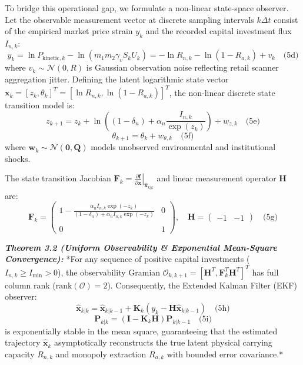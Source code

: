 \documentclass[preprint,12pt,authoryear]{elsarticle}
\theoremstyle{definition}
\begin{document}
To bridge this operational gap, we formulate a non-linear state-space observer. Let the observable measurement vector at discrete sampling intervals $k \Delta t$ consist of the empirical market price strain $y_k$ and the recorded capital investment flux $I_{n,k}$: $$y_k = \ln P_{\text{kinetic},k} - \ln(m_1 m_2 \gamma_v S_k U_k) = -\ln R_{n,k} - \ln(1 - R_{a,k}) + v_k \quad \text{(5d)}$$ where $v_k \sim \mathcal{N}(0, R)$ is Gaussian observation noise reflecting retail scanner aggregation jitter. Defining the latent logarithmic state vector $\mathbf{x}_k = [z_k, \theta_k]^T = [\ln R_{n,k}, \ln(1 - R_{a,k})]^{T}$, the non-linear discrete state transition model is: $$z_{k+1} = z_k + \ln\left( (1 - \delta_n) + \alpha_n \frac{I_{n,k}}{\exp(z_k)} \right) + w_{z,k} \quad \text{(5e)}$$ $$\theta_{k+1} = \theta_k + w_{\theta,k} \quad \text{(5f)}$$ where $\mathbf{w}_k \sim \mathcal{N}(\mathbf{0}, \mathbf{Q})$ models unobserved environmental and institutional shocks.

The state transition Jacobian $\mathbf{F}_k = \left. \frac{\partial \mathbf{f}}{\partial \mathbf{x}} \right|_{\hat{\mathbf{x}}_{k|k}}$ and linear measurement operator $\mathbf{H}$ are: $$\mathbf{F}_k = \begin{pmatrix} 1 - \frac{\alpha_n I_{n,k} \exp(-z_k)}{(1 - \delta_n) + \alpha_n I_{n,k} \exp(-z_k)} & 0 \\\\ 0 & 1 \end{pmatrix}, \quad \mathbf{H} = \begin{pmatrix} -1 & -1 \end{pmatrix} \quad \text{(5g)}$$

\textbf{\textit{Theorem 3.2 (Uniform Observability \& Exponential Mean-Square Convergence):}} *For any sequence of positive capital investments ($I_{n,k} \ge I_{\min} > 0$), the observability Gramian $\mathcal{O}_{k, k+1} = [\mathbf{H}^T, \mathbf{F}_k^T \mathbf{H}^T]^T$ has full column rank ($\text{rank}(\mathcal{O}) = 2$). Consequently, the Extended Kalman Filter (EKF) observer: $$\hat{\mathbf{x}}_{k|k} = \hat{\mathbf{x}}_{k|k-1} + \mathbf{K}_k (y_k - \mathbf{H} \hat{\mathbf{x}}_{k|k-1}) \quad \text{(5h)}$$ $$\mathbf{P}_{k|k} = (\mathbf{I} - \mathbf{K}_k \mathbf{H}) \mathbf{P}_{k|k-1} \quad \text{(5i)}$$ is exponentially stable in the mean square, guaranteeing that the estimated trajectory $\hat{\mathbf{x}}_k$ asymptotically reconstructs the true latent physical carrying capacity $R_{n,k}$ and monopoly extraction $R_{a,k}$ with bounded error covariance.*
\end{document}
